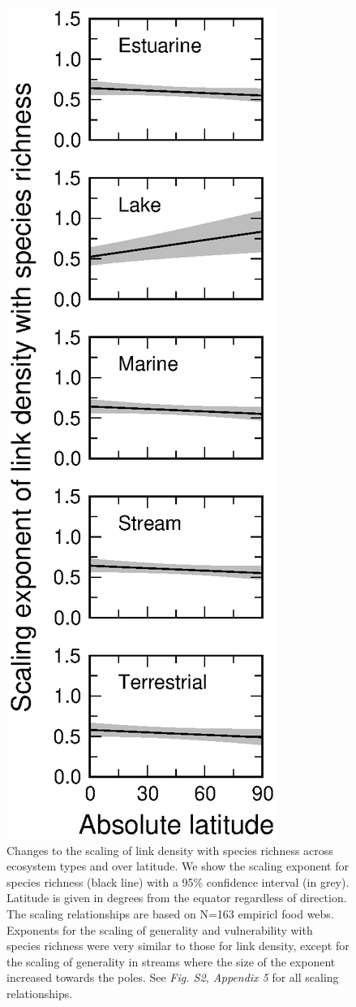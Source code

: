 \documentclass[12pt]{article}
\begin{document}

\begin{figure}[h]
\centerline{\includegraphics*[height=.65\textheight]{Figures/by_TL/marginal/justS_marginal_latitude.eps}}
\caption{Changes to the scaling of link density with species richness across ecosystem
types and over latitude. We show the scaling exponent for species richness (black
line) with a 95\% confidence interval (in grey). Latitude is given in degrees from the equator
regardless of direction. The scaling relationships are based on N=163 empiricl food webs. 
Exponents for the scaling of generality and vulnerability with species richness were very 
similar to those for link density, except for the scaling of generality in streams where 
the size of the exponent increased towards the poles. See \emph{Fig. S2, Appendix 5} for 
all scaling relationships.}
\label{S}
\end{figure}
\end{document}

